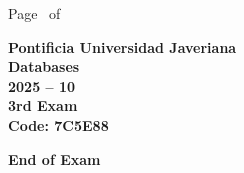 \documentclass[11pt, addpoints]{exam}\usepackage[utf8]{inputenc}
\begin{document}
\begin{coverpages}
\begin{center}
			\vspace{3mm}
			\leavevmode \hspace{5mm} 
		\end{center}
	\end{coverpages}

	\footer{} {Page \thepage\ of \numpages} {}

	\centering
	\textbf{\Large Pontificia Universidad Javeriana}\\
	\textbf{\Large Databases} \\
	\textbf{\large 2025 -- 10} \\
	\textbf{\large 3rd Exam} \\
	\textbf{Code: 7C5E88}


	\begin{questions}
		
		
		
		
		
		
		
		
		
		
		
		
		
		
		
		
		
		
		
		
	\end{questions}

	\vspace{5mm}
	\noindent \textbf{End of Exam}
\end{document}
